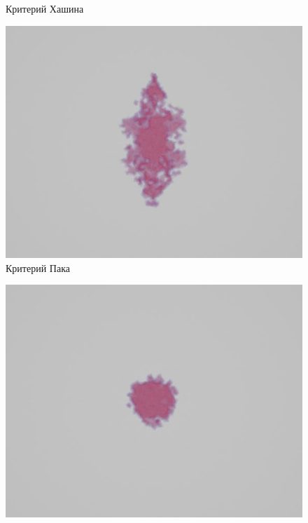 \documentclass[xcolor={usenames,dvipsnames,svgnames,table}]{beamer}
\begin{document}
\begin{frame}
\begin{center}
\begin{minipage}[h]{0.30\textwidth}
\begin{figure}[h]
                \tiny
                \caption{Критерий Хашина}
            \end{figure}
        \end{minipage}
        \begin{minipage}[h]{0.30\textwidth}
            \begin{figure}[h]
                \includegraphics[width=\textwidth]{png/3-stringer-panel/cover-puck.png}
                \tiny
                \caption{Критерий Пака}
            \end{figure}
        \end{minipage}
        \begin{minipage}[h]{0.30\textwidth}
            \begin{figure}[h]
                \includegraphics[width=\textwidth]{png/3-stringer-panel/cover-tsai-hill.png}

\end{figure}
\end{minipage}
\end{center}
\end{frame}
\end{document}

